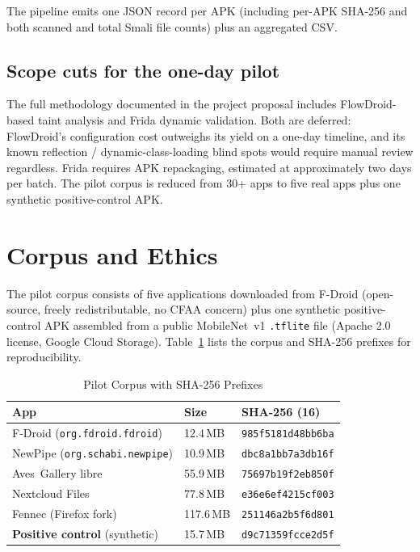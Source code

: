 \documentclass[conference]{IEEEtran}
\begin{document}
The pipeline emits one JSON record per APK (including per-APK SHA-256
and both scanned and total Smali file counts) plus an aggregated CSV.

\subsection{Scope cuts for the one-day pilot}

The full methodology documented in the project proposal includes
FlowDroid-based taint analysis and Frida dynamic validation. Both are
deferred: FlowDroid's configuration cost outweighs its yield on a
one-day timeline, and its known reflection / dynamic-class-loading
blind spots would require manual review regardless. Frida requires
APK repackaging, estimated at approximately two days per batch. The
pilot corpus is reduced from 30+ apps to five real apps plus one
synthetic positive-control APK.

\section{Corpus and Ethics}
\label{sec:corpus}

The pilot corpus consists of five applications downloaded from
F-Droid (open-source, freely redistributable, no CFAA concern) plus
one synthetic positive-control APK assembled from a public
MobileNet~v1 \texttt{.tflite} file (Apache 2.0 license, Google Cloud
Storage). Table~\ref{tab:corpus} lists the corpus and SHA-256
prefixes for reproducibility.

\begin{table}[htbp]
\caption{Pilot Corpus with SHA-256 Prefixes}
\label{tab:corpus}
\centering
\footnotesize
\begin{tabular}{@{}lll@{}}
\toprule
\textbf{App} & \textbf{Size} & \textbf{SHA-256 (16)} \\
\midrule
F-Droid (\texttt{org.fdroid.fdroid}) & 12.4\,MB & \texttt{985f5181d48bb6ba} \\
NewPipe (\texttt{org.schabi.newpipe}) & 10.9\,MB & \texttt{dbc8a1bb7a3db16f} \\
Aves~Gallery libre & 55.9\,MB & \texttt{75697b19f2eb850f} \\
Nextcloud Files & 77.8\,MB & \texttt{e36e6ef4215cf003} \\
Fennec (Firefox fork) & 117.6\,MB & \texttt{251146a2b5f6d801} \\
\textbf{Positive control} (synthetic) & 15.7\,MB & \texttt{d9c71359fcce2d5f} \\
\bottomrule
\end{tabular}
\end{table}
\end{document}

